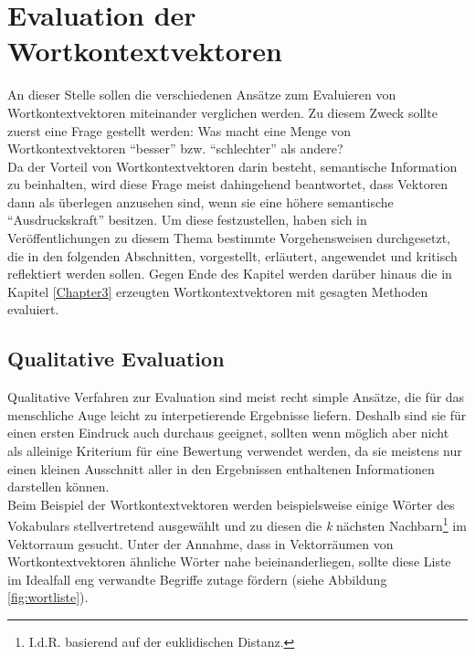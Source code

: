 \section{Evaluation der Wortkontextvektoren}\label{sec:we-eval}

An dieser Stelle sollen die verschiedenen Ansätze zum Evaluieren von Wortkontextvektoren miteinander verglichen werden. Zu diesem Zweck sollte zuerst eine Frage gestellt werden:
Was macht eine Menge von Wortkontextvektoren ``besser'' bzw. ``schlechter'' als andere?\\
Da der Vorteil von Wortkontextvektoren darin besteht, semantische Information zu beinhalten, wird diese
Frage meist dahingehend beantwortet, dass Vektoren dann als überlegen anzusehen sind, wenn sie
eine höhere semantische ``Ausdruckskraft'' besitzen. Um diese festzustellen, haben sich in Veröffentlichungen
zu diesem Thema bestimmte Vorgehensweisen durchgesetzt, die in den folgenden Abschnitten, vorgestellt, erläutert,
angewendet und kritisch reflektiert werden sollen. Gegen Ende des Kapitel werden darüber hinaus die in Kapitel \ref{Chapter3}
erzeugten Wortkontextvektoren mit gesagten Methoden evaluiert.\\

  \subsection{Qualitative Evaluation}

  Qualitative Verfahren zur Evaluation sind meist recht simple Ansätze, die für das menschliche
  Auge leicht zu interpetierende Ergebnisse liefern. Deshalb sind sie für einen ersten Eindruck
  auch durchaus geeignet, sollten wenn möglich aber nicht als alleinige Kriterium für eine Bewertung
  verwendet werden, da sie meistens nur einen kleinen Ausschnitt aller in den Ergebnissen enthaltenen
  Informationen darstellen können. \\
  Beim Beispiel der Wortkontextvektoren werden beispielsweise einige Wörter des Vokabulars stellvertretend ausgewählt
  und zu diesen die \emph{k} nächsten Nachbarn\footnote{I.d.R. basierend auf der euklidischen Distanz.} im Vektorraum gesucht.
  Unter der Annahme, dass in Vektorräumen von Wortkontextvektoren ähnliche Wörter nahe beieinanderliegen, sollte diese Liste
  im Idealfall eng verwandte Begriffe zutage fördern (siehe Abbildung \ref{fig:wortliste}).\\

